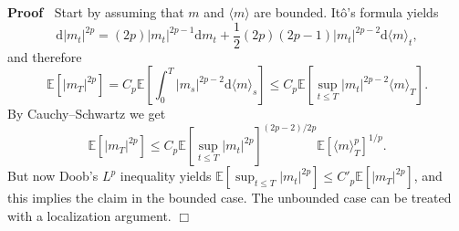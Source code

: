 \documentclass[a4paper,11pt]{article}
\newcommand{\mathd}{\mathrm{d}}
\newenvironment{proof}{\noindent\textbf{Proof\ }}{\hspace*{\fill}$\Box$\medskip}
\begin{document}
\begin{proof}
  Start by assuming that $m$ and $\langle m \rangle$ are bounded. It{\^o}'s
  formula yields
  \[ \mathd | m_t |^{2 p} = (2 p) | m_t |^{2 p - 1} \mathd m_t + \frac{1}{2}
     (2 p) (2 p - 1) | m_t |^{2 p - 2} \mathd \langle m \rangle_t, \]
  and therefore
  \[ \mathbb{E} [| m_T |^{2 p}] = C_p \mathbb{E} \left[ \int_0^T | m_s |^{2
     p - 2} \mathd \langle m \rangle_s \right] \leqslant C_p \mathbb{E}
     [\sup_{t \leqslant T} | m_t |^{2 p - 2} \langle m \rangle_T] . \]
  By Cauchy--Schwartz we get
  \[ \mathbb{E} [| m_T |^{2 p}] \leqslant C_p \mathbb{E} [\sup_{t \leqslant
     T} | m_t |^{2 p}]^{(2 p - 2) / 2 p} \mathbb{E} [\langle m
     \rangle_T^p]^{1 / p} . \]
  But now Doob's $L^p$ inequality yields $\mathbb{E} [\sup_{t \leqslant T} |
  m_t |^{2 p}] \leqslant C'_p \mathbb{E} [| m_T |^{2 p}]$, and this implies
  the claim in the bounded case. The unbounded case can be treated with a
  localization argument. 
\end{proof}
\end{document}
